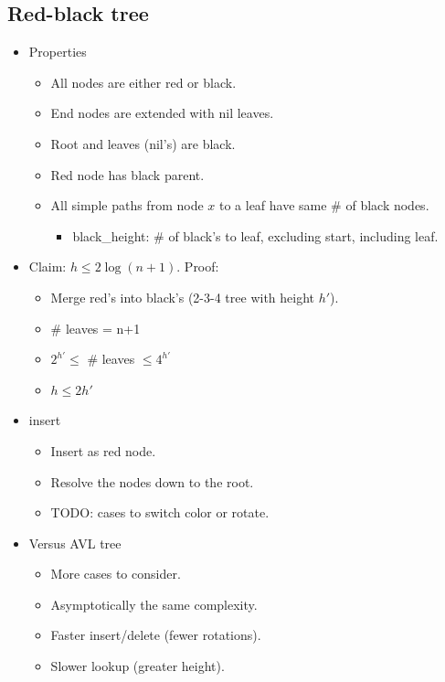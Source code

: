 \documentclass[twocolumn]{article}
\begin{document}
\subsection{Red-black tree}
\begin{itemize}
\item Properties
  \begin{itemize}
  \item All nodes are either red or black.
  \item End nodes are extended with nil leaves.
  \item Root and leaves (nil's) are black.
  \item Red node has black parent.
  \item All simple paths from node $x$ to a leaf have same \# of black nodes.
    \begin{itemize}
      \item black\_height: \# of black's to leaf, excluding start, including leaf.
    \end{itemize}
  \end{itemize}
\item Claim: $h \le 2 \log (n+1)$. Proof:
  \begin{itemize}
  \item Merge red's into black's (2-3-4 tree with height $h'$).
  \item \# leaves = n+1
  \item $2^{h'} \le$ \# leaves $\le 4^{h'}$ 
  \item $h \le 2 h'$
  \end{itemize}
\item insert
  \begin{itemize}
  \item Insert as red node.
  \item Resolve the nodes down to the root.
  \item TODO: cases to switch color or rotate.
  \end{itemize}
\item Versus AVL tree
  \begin{itemize}
  \item More cases to consider.
  \item Asymptotically the same complexity.
  \item Faster insert/delete (fewer rotations).
  \item Slower lookup (greater height).
  \end{itemize}
\end{itemize}
\end{document}
